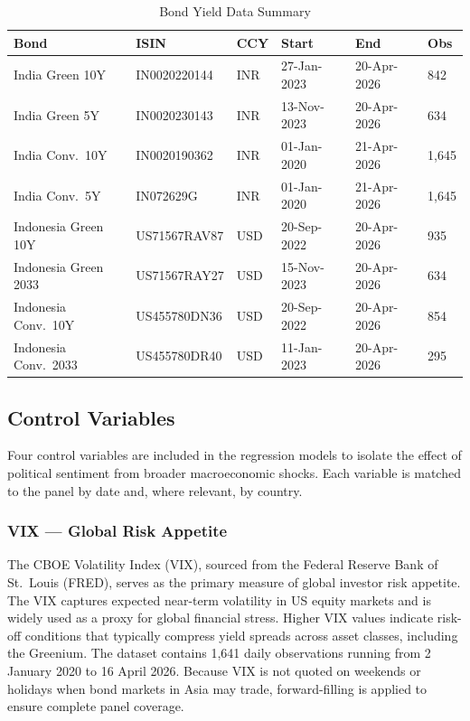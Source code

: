 \documentclass[12pt,a4paper]{article}
\begin{document}
\begin{table}[H]
\caption{Bond Yield Data Summary}
\label{tab:bonds}
\centering
\small
{}
\begin{tabular}{L{3.0cm} L{2.8cm} C{1.1cm} C{2.0cm} C{2.0cm} R{1.0cm}}
\toprule
{}
\textbf{Bond} & \textbf{ISIN} & \textbf{CCY} & \textbf{Start} & \textbf{End} & \textbf{Obs} \\
\midrule
India Green 10Y      & IN0020220144 & INR & 27-Jan-2023 & 20-Apr-2026 & 842   \\
India Green 5Y       & IN0020230143 & INR & 13-Nov-2023 & 20-Apr-2026 & 634   \\
India Conv.\ 10Y     & IN0020190362 & INR & 01-Jan-2020 & 21-Apr-2026 & 1,645 \\
India Conv.\ 5Y      & IN072629G    & INR & 01-Jan-2020 & 21-Apr-2026 & 1,645 \\
\midrule
Indonesia Green 10Y  & US71567RAV87 & USD & 20-Sep-2022 & 20-Apr-2026 & 935   \\
Indonesia Green 2033 & US71567RAY27 & USD & 15-Nov-2023 & 20-Apr-2026 & 634   \\
Indonesia Conv.\ 10Y & US455780DN36 & USD & 20-Sep-2022 & 20-Apr-2026 & 854   \\
Indonesia Conv.\ 2033& US455780DR40 & USD & 11-Jan-2023 & 20-Apr-2026 & 295   \\
\bottomrule
\end{tabular}
\end{table}

\subsection{Control Variables}

Four control variables are included in the regression models to isolate the effect of political sentiment from broader macroeconomic shocks. Each variable is matched to the panel by date and, where relevant, by country.

\subsubsection{VIX --- Global Risk Appetite}

The CBOE Volatility Index (VIX), sourced from the Federal Reserve Bank of St.\ Louis (FRED), serves as the primary measure of global investor risk appetite. The VIX captures expected near-term volatility in US equity markets and is widely used as a proxy for global financial stress. Higher VIX values indicate risk-off conditions that typically compress yield spreads across asset classes, including the Greenium. The dataset contains 1,641 daily observations running from 2 January 2020 to 16 April 2026. Because VIX is not quoted on weekends or holidays when bond markets in Asia may trade, forward-filling is applied to ensure complete panel coverage.
\end{document}
